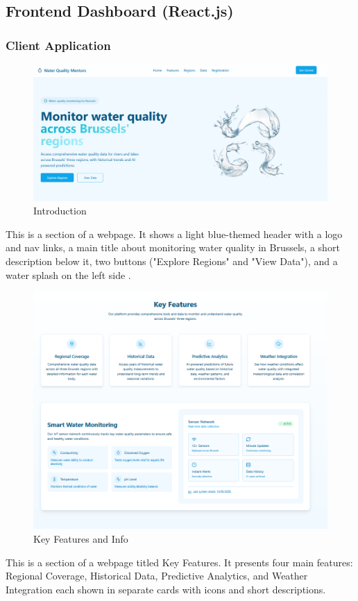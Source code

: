 \subsection{Frontend Dashboard (React.js)}
\subsubsection{Client Application}
\begin{figure}[H]
    \centering
    \includegraphics[width=0.75\linewidth]{Figures/clientpart1.png}
    \caption{Introduction}
    \label{fig:enter-label}
\end{figure}
This is a section of a webpage. It shows a light blue-themed header with a logo and nav links, a main title about monitoring water quality in Brussels, a short description below it, two buttons ("Explore Regions" and "View Data"), and a water splash on the left side .
\begin{figure}[H]
    \centering
    \includegraphics[width=0.75\linewidth]{Figures/clientpart2.png}
    \caption{Key Features and Info}
    \label{fig:enter-label}
\end{figure}
This is a section of a webpage titled Key Features. It presents four main features: Regional Coverage, Historical Data, Predictive Analytics, and Weather Integration each shown in separate cards with icons and short descriptions.

